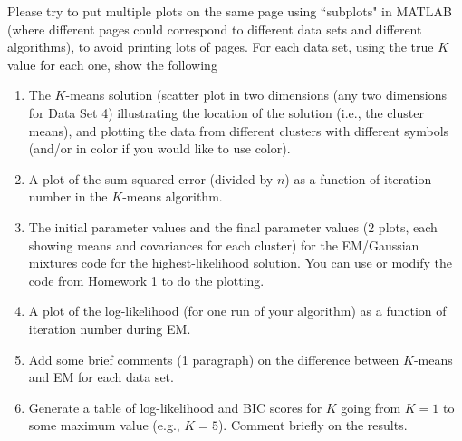 \documentclass[11pt,psfig]{article}
\begin{document}
 Please try to put multiple plots on the same page using ``subplots" in MATLAB
(where different pages could correspond to different data sets and different
algorithms), to avoid printing lots of pages. For each data set, using the
true $K$ value for each one, show the following
\begin{enumerate}
\item The $K$-means solution (scatter plot in
 two dimensions (any two dimensions for Data Set 4)
 illustrating the location of the solution (i.e.,
 the cluster means), and plotting the data from different
 clusters with different symbols (and/or in color if you would like to use color).
\item A plot of the sum-squared-error (divided by $n$) as a function of
iteration number in the $K$-means algorithm. 
\item The initial parameter values
and the final parameter values (2 plots, each showing means and covariances for
each cluster) for the EM/Gaussian mixtures code  for the
highest-likelihood solution. You can use or modify the code from Homework 1 to do the plotting. 

\item A plot of the log-likelihood (for one run of your algorithm) as a
function of iteration number during EM. 

\item Add some brief comments (1
paragraph) on the difference between $K$-means and EM for each data set. 
\item  Generate a table of log-likelihood and BIC scores for
$K$ going from $K=1$ to some maximum value (e.g., $K=5$). Comment briefly on the results.  


\end{enumerate}
\end{document}
